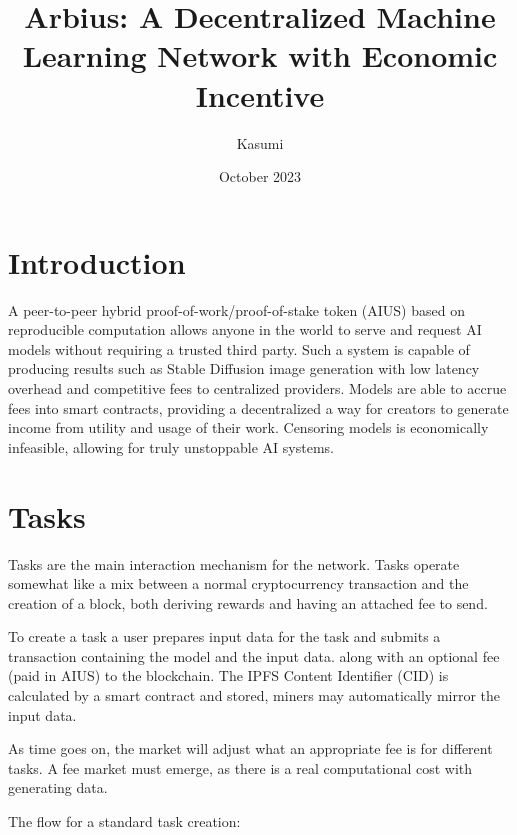 \documentclass{article}
\title{Arbius: A Decentralized Machine Learning Network with Economic Incentive}
\author{Kasumi}
\date{October 2023}
\begin{document}
\maketitle

\section{Introduction}

A peer-to-peer hybrid proof-of-work/proof-of-stake token (AIUS) based on reproducible computation allows anyone in the world to serve and request AI models without requiring a trusted third party. Such a system is capable of producing results such as Stable Diffusion \cite{stablediffusion} image generation with low latency overhead and competitive fees to centralized providers. Models are able to accrue fees into smart contracts, providing a decentralized a way for creators to generate income from utility and usage of their work. Censoring models is economically infeasible, allowing for truly unstoppable AI systems.

\section{Tasks}

Tasks are the main interaction mechanism for the network. Tasks operate somewhat like a mix between a normal cryptocurrency transaction and the creation of a block, both deriving rewards and having an attached fee to send.

To create a task a user prepares input data for the task and submits a transaction containing the model and the input data. along with an optional fee (paid in AIUS) to the blockchain. The IPFS\cite{benet2014ipfs} Content Identifier (CID) is calculated by a smart contract and stored, miners may automatically mirror the input data.

As time goes on, the market will adjust what an appropriate fee is for different tasks. A fee market must emerge, as there is a real computational cost with generating data.


The flow for a standard task creation:
\end{document}
